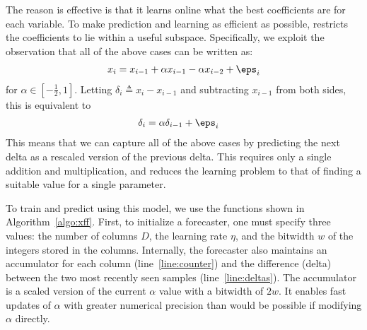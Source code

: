 The reason \fire is effective is that it learns online what the best coefficients are for each variable.
To make prediction and learning as efficient as possible, \justfire \text{} restricts the coefficients to lie within a useful subspace. Specifically, we exploit the observation that all of the above cases can be written as:
\begin{align}
    x_i = x_{i-1} + \alpha x_{i-1} - \alpha x_{i-2} + \eps_i
\end{align}
for $\alpha \in [-\frac{1}{2}, 1]$. Letting $\delta_i \triangleq x_i - x_{i-1}$ and subtracting $x_{i-1}$ from both sides, this is equivalent to
\begin{align}
    \delta_i &= \alpha \delta_{i-1} + \eps_i
\end{align}
This means that we can capture all of the above cases by predicting the next delta as a rescaled version of the previous delta. This requires only a single addition and multiplication, and reduces the learning problem to that of finding a suitable value for a single parameter.


To train and predict using this model, we use the functions shown in Algorithm~\ref{algo:xff}. First, to initialize a \fire forecaster, one must specify three values: the number of columns $D$, the learning rate $\eta$, and the bitwidth $w$ of the integers stored in the columns. Internally, the forecaster also maintains an accumulator for each column (line~\ref{line:counter}) and the difference (delta) between the two most recently seen samples (line~\ref{line:deltas}). The accumulator is a scaled version of the current $\alpha$ value with a bitwidth of $2w$. It enables fast updates of $\alpha$ with greater numerical precision than would be possible if modifying $\alpha$ directly. %

